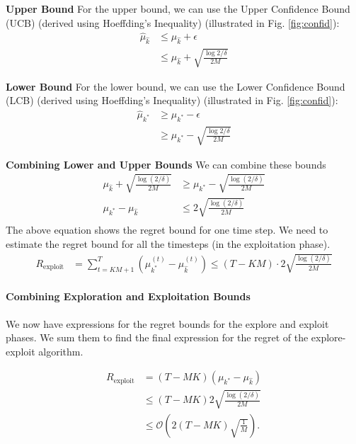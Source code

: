 \documentclass[11pt]{article}
\begin{document}
\textbf{Upper Bound} For the upper bound, we can use the Upper Confidence Bound (UCB) (derived using Hoeffding's Inequality) (illustrated
in Fig. \ref{fig:confid}):
\begin{align*}
\hat{\mu}_{\hat{k}} &\leq \mu_{\hat{k}} + \epsilon\\
&\leq \mu_{\hat{k}} + \sqrt{\frac{\log{2/\delta}}{2M}}
\end{align*}

\textbf{Lower Bound} For the lower bound, we can use the Lower Confidence Bound (LCB) (derived using Hoeffding's Inequality) (illustrated
in Fig. \ref{fig:confid}):
\begin{align*}
\hat{\mu}_{{k^*}} &\geq \mu_{k^*} - \epsilon\\
&\geq \mu_{k^*} - \sqrt{\frac{\log{2/\delta}}{2M}}
\end{align*}

\textbf{Combining Lower and Upper Bounds} We can combine these bounds 
\begin{align*}
\mu_{\hat{k}} + \sqrt{\frac{\log (2/\delta)}{2M}} &\geq \mu_{k^*} - \sqrt{\frac{\log (2/\delta)}{2M}}\\
\mu_{k^*} - \mu_{\hat{k}} &\leq 2 \sqrt{\frac{\log (2/\delta)}{2M}}\\
\end{align*}
The above equation shows the regret bound for one time step. We need to estimate the regret bound for all the timesteps (in the exploitation phase).
\begin{align*}
R_{\text{exploit}} &= \sum_{t=KM+1}^T (\mu_{k^*}^{(t)} - \mu_{\hat{k}}^{(t)}) \leq (T - KM) \cdot 2 \sqrt{\frac{\log (2/\delta)}{2M}}
\end{align*}

\paragraph{Combining Exploration and Exploitation Bounds}
We now have expressions for the regret bounds for the explore and exploit phases. We sum them to find the final expression for the regret of the explore-exploit algorithm.

\begin{align*}
    R_{\text{exploit}} &= (T-MK)(\mu_{k^{\ast}} - \mu_{\widehat{k}})\\
    &\leq (T-MK)2\sqrt{\frac{\log(2/\delta)}{2M}}\\
    &\leq \mathcal{O}\left(2(T-MK) \sqrt{\frac{1}{M}}\right).
\end{align*}
\end{document}
